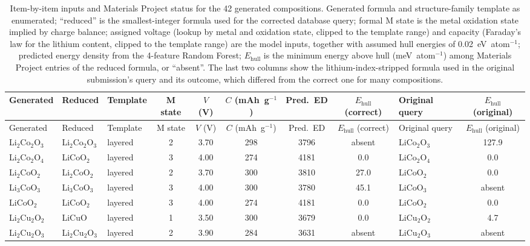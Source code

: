 \documentclass[10pt]{article}
\begin{document}
\clearpage
\begin{center}
\footnotesize
\setlength{\tabcolsep}{3.5pt}
\renewcommand{\arraystretch}{1.15}
\begin{longtable}{l l l c c c c c l c}
\caption{Item-by-item inputs and Materials Project status for the 42 generated compositions. Generated formula and structure-family template as enumerated; ``reduced'' is the smallest-integer formula used for the corrected database query; formal M state is the metal oxidation state implied by charge balance; assigned voltage (lookup by metal and oxidation state, clipped to the template range) and capacity (Faraday's law for the lithium content, clipped to the template range) are the model inputs, together with assumed hull energies of 0.02~eV~atom$^{-1}$; predicted energy density from the 4-feature Random Forest; $E_\mathrm{hull}$ is the minimum energy above hull (meV~atom$^{-1}$) among Materials Project entries of the reduced formula, or ``absent''. The last two columns show the lithium-index-stripped formula used in the original submission's query and its outcome, which differed from the correct one for many compositions.}\label{tab:s3_novel}\\
\hline
Generated & Reduced & Template & M state & $V$ (V) & $C$ (mAh~g$^{-1}$) & Pred.\ ED & $E_\mathrm{hull}$ (correct) & Original query & $E_\mathrm{hull}$ (original) \\
\hline
\endfirsthead
\hline
Generated & Reduced & Template & M state & $V$ (V) & $C$ (mAh~g$^{-1}$) & Pred.\ ED & $E_\mathrm{hull}$ (correct) & Original query & $E_\mathrm{hull}$ (original) \\
\hline
\endhead
Li$_{2}$Co$_{2}$O$_{3}$ & Li$_{2}$Co$_{2}$O$_{3}$ & layered & 2 & 3.70 & 298 & 3796 & absent & LiCo$_{2}$O$_{3}$ & 127.9 \\
Li$_{2}$Co$_{2}$O$_{4}$ & LiCoO$_{2}$ & layered & 3 & 4.00 & 274 & 4181 & 0.0 & LiCo$_{2}$O$_{4}$ & 0.0 \\
Li$_{2}$CoO$_{2}$ & Li$_{2}$CoO$_{2}$ & layered & 2 & 3.70 & 300 & 3810 & 27.0 & LiCoO$_{2}$ & 0.0 \\
Li$_{3}$CoO$_{3}$ & Li$_{3}$CoO$_{3}$ & layered & 3 & 4.00 & 300 & 3780 & 45.1 & LiCoO$_{3}$ & absent \\
LiCoO$_{2}$ & LiCoO$_{2}$ & layered & 3 & 4.00 & 274 & 4181 & 0.0 & LiCoO$_{2}$ & 0.0 \\
Li$_{2}$Cu$_{2}$O$_{2}$ & LiCuO & layered & 1 & 3.50 & 300 & 3679 & 0.0 & LiCu$_{2}$O$_{2}$ & 4.7 \\
Li$_{2}$Cu$_{2}$O$_{3}$ & Li$_{2}$Cu$_{2}$O$_{3}$ & layered & 2 & 3.90 & 284 & 3631 & absent & LiCu$_{2}$O$_{3}$ & absent \\

\end{longtable}
\end{center}
\end{document}
